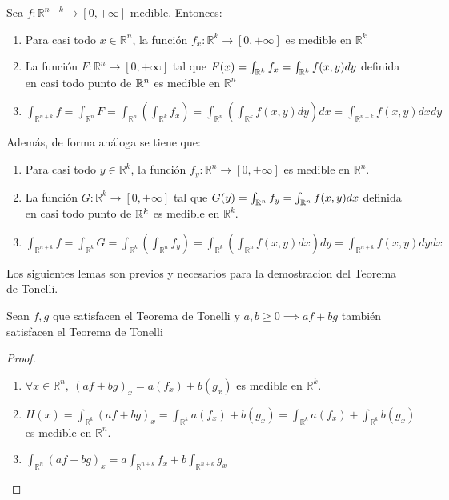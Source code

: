 \begin{teorema}
    Sea $f : \mathbb{R}^{n+k} \to [0, +\infty]$ medible. Entonces:
    \begin{enumerate}
        \item Para casi todo $x \in \mathbb{R}^n$, la función $f_{x} : \mathbb{R}^k \to [0,
                      +\infty]$ es medible en $\mathbb{R}^k$
        \item La función $F: \mathbb{R}^n \to [0, +\infty]$ tal que $F(x) =
                  \int_{\mathbb{R}^k}f_x = \int_{\mathbb{R}^k} f(x,y)dy$ definida en casi todo punto de
              $\mathbb{R}^n$ es medible en $\mathbb{R}^n$
        \item $\int_{\mathbb{R}^{n+k}}f = \int_{\mathbb{R}^n}F = \int_{\mathbb{R}^n}(\int_{\mathbb{R}^k}f_x) = \int_{\mathbb{R}^n}(\int_{\mathbb{R}^k}f(x,y)dy)dx = \int_{\mathbb{R}^{n+k}}f(x,y)dxdy$
    \end{enumerate}
    Además, de forma análoga se tiene que:
    \begin{enumerate}
        \item Para casi todo $y \in \mathbb{R}^k$, la función $f_{y} : \mathbb{R}^n \to [0,
                      +\infty]$ es medible en $\mathbb{R}^n$.
        \item La función $G: \mathbb{R}^k \to [0, +\infty]$ tal que $G(y) =
                  \int_{\mathbb{R}^n}f_y = \int_{\mathbb{R}^n} f(x,y)dx$ definida en casi todo punto de
              $\mathbb{R}^k$ es medible en $\mathbb{R}^k$.
        \item $\int_{\mathbb{R}^{n+k}}f = \int_{\mathbb{R}^k}G = \int_{\mathbb{R}^k}(\int_{\mathbb{R}^n}f_y) = \int_{\mathbb{R}^k}(\int_{\mathbb{R}^n}f(x,y)dx)dy = \int_{\mathbb{R}^{n+k}}f(x,y)dydx$
    \end{enumerate}
\end{teorema}

\begin{observación}
Los siguientes lemas son previos y necesarios para la demostracion del Teorema de Tonelli.
\end{observación}

\label{lema1Tonelli}
\begin{lema}
    Sean $f,g$ que satisfacen el Teorema de Tonelli y $a, b \geq 0 \implies af + bg$ también satisfacen el Teorema de Tonelli
\end{lema}

\begin{proof}
    \leavevmode
    \begin{enumerate}
        \item $\forall x \in \mathbb{R}^n, \ (af + bg)_x = a(f_x) + b(g_x)$ es medible en $\mathbb{R}^k$.
        \item $H(x) = \int_{\mathbb{R}^k}(af + bg)_x = \int_{\mathbb{R}^k}a(f_x) + b(g_x) = \int_{\mathbb{R}^k}a(f_x) + \int_{\mathbb{R}^k}b(g_x)$ es medible en $\mathbb{R}^n$.
        \item $\int_{\mathbb{R}^{n}}(af +bg)_x = a\int_{\mathbb{R}^{n+k}}f_x + b \int_{\mathbb{R}^{n+k}}g_x$
    \end{enumerate}
\end{proof}

